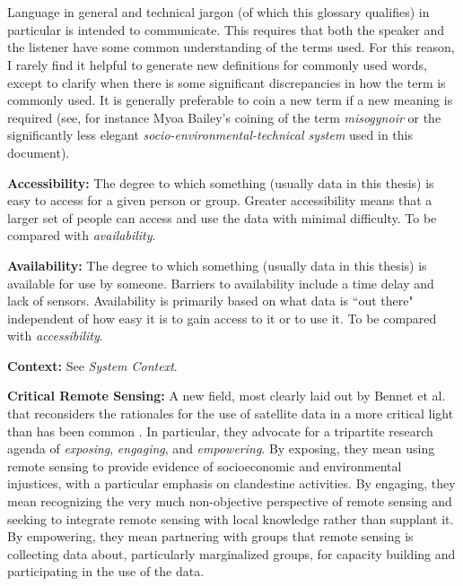 \chapter{} \label{glossary}

Language in general and technical jargon (of which this glossary qualifies) in particular is intended to communicate. This requires that both the speaker and the listener have some common understanding of the terms used. For this reason, I rarely find it helpful to generate new definitions for commonly used words, except to clarify when there is some significant discrepancies in how the term is commonly used. It is generally preferable to coin a new term if a new meaning is required (see, for instance Myoa Bailey's coining of the term \textit{misogynoir} \cite{baileyMoreOriginMisogynoir} or the significantly less elegant \textit{socio-environmental-technical system} used in this document).  

\textbf{Accessibility:} The degree to which something (usually data in this thesis) is easy to access for a given person or group. Greater accessibility means that a larger set of people can access and use the data with minimal difficulty. To be compared with \textit{availability}.

\textbf{Availability:} The degree to which something (usually data in this thesis) is available for use by someone. Barriers to availability include a time delay and lack of sensors. Availability is primarily based on what data is ``out there" independent of how easy it is to gain access to it or to use it. To be compared with \textit{accessibility}. 


\textbf{Context:} See \textit{System Context}.

\textbf{Critical Remote Sensing:} A new field, most clearly laid out by Bennet et al. that reconsiders the rationales for the use of satellite data in a more critical light than has been common \cite{bennettPoliticsPixelsReview2022}. In particular, they advocate for a tripartite research agenda of \textit{exposing}, \textit{engaging}, and \textit{empowering}. By exposing, they mean using remote sensing to provide evidence of socioeconomic and environmental injustices, with a particular emphasis on clandestine activities. By engaging, they mean recognizing the very much non-objective perspective of remote sensing and seeking to integrate remote sensing with local knowledge rather than supplant it. By empowering, they mean partnering with groups that remote sensing is collecting data about, particularly marginalized groups, for capacity building and participating in the use of the data.

